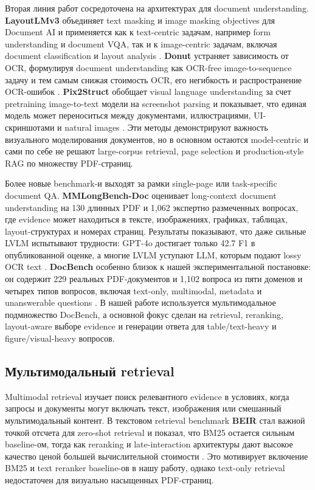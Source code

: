 \documentclass[conference]{IEEEtran}
\begin{document}
Вторая линия работ сосредоточена на архитектурах для document understanding. \textbf{LayoutLMv3} объединяет text masking и image masking objectives для Document AI и применяется как к text-centric задачам, например form understanding и document VQA, так и к image-centric задачам, включая document classification и layout analysis \cite{layoutlmv32022}. \textbf{Donut} устраняет зависимость от OCR, формулируя document understanding как OCR-free image-to-sequence задачу и тем самым снижая стоимость OCR, его негибкость и распространение OCR-ошибок \cite{donut2021}. \textbf{Pix2Struct} обобщает visual language understanding за счет pretraining image-to-text модели на screenshot parsing и показывает, что единая модель может переноситься между документами, иллюстрациями, UI-скриншотами и natural images \cite{pix2struct2022}. Эти методы демонстрируют важность визуального моделирования документов, но в основном остаются model-centric и сами по себе не решают large-corpus retrieval, page selection и production-style RAG по множеству PDF-страниц.

Более новые benchmark-и выходят за рамки single-page или task-specific document QA. \textbf{MMLongBench-Doc} оценивает long-context document understanding на 130 длинных PDF и 1,062 экспертно размеченных вопросах, где evidence может находиться в тексте, изображениях, графиках, таблицах, layout-структурах и номерах страниц. Результаты показывают, что даже сильные LVLM испытывают трудности: GPT-4o достигает только 42.7 F1 в опубликованной оценке, а многие LVLM уступают LLM, которым подают lossy OCR text \cite{mmlongbenchdoc2024}. \textbf{DocBench} особенно близок к нашей экспериментальной постановке: он содержит 229 реальных PDF-документов и 1,102 вопроса из пяти доменов и четырех типов вопросов, включая text-only, multimodal, metadata и unanswerable questions \cite{docbench2024}. В нашей работе используется мультимодальное подмножество DocBench, а основной фокус сделан на retrieval, reranking, layout-aware выборе evidence и генерации ответа для table/text-heavy и figure/visual-heavy вопросов.

\subsection{Мультимодальный retrieval}

Multimodal retrieval изучает поиск релевантного evidence в условиях, когда запросы и документы могут включать текст, изображения или смешанный мультимодальный контент. В текстовом retrieval benchmark \textbf{BEIR} стал важной точкой отсчета для zero-shot retrieval и показал, что BM25 остается сильным baseline-ом, тогда как reranking и late-interaction архитектуры дают высокое качество ценой большей вычислительной стоимости \cite{beir2021}. Это мотивирует включение BM25 и text reranker baseline-ов в нашу работу, однако text-only retrieval недостаточен для визуально насыщенных PDF-страниц.
\end{document}
